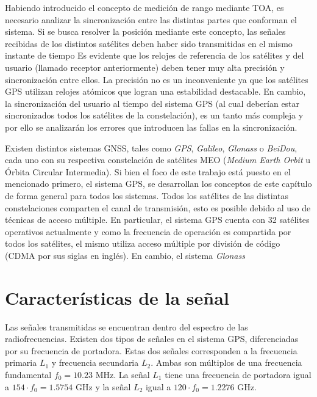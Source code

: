 \documentclass[a4paper,12pt,oneside,onecolumn,final,openright]{book}%
\begin{document}
	Habiendo introducido el concepto de medición de rango mediante TOA, es necesario analizar la sincronización entre las distintas partes que conforman el sistema. Si se busca resolver la posición mediante este concepto, las señales recibidas de los distintos satélites deben haber sido transmitidas en el mismo instante de tiempo Es evidente que los relojes de referencia de los satélites y del usuario (llamado receptor anteriormente) deben tener muy alta precisión y sincronización entre ellos. La precisión no es un inconveniente ya que los satélites GPS utilizan relojes atómicos que logran una estabilidad destacable. En cambio, la sincronización del usuario al tiempo del sistema GPS (al cual deberían estar sincronizados todos los satélites de la constelación), es un tanto más compleja y por ello se analizarán los errores que introducen las fallas en la sincronización.
	
	Existen distintos sistemas GNSS, tales como \textit{GPS}, \textit{Galileo}, \textit{Glonass} o \textit{BeiDou}, cada uno con su respectiva constelación de satélites MEO (\textit{Medium Earth Orbit} u Órbita Circular Intermedia). Si bien el foco de este trabajo está puesto en el mencionado primero, el sistema GPS, se desarrollan los conceptos de este capítulo de forma general para todos los sistemas. Todos los satélites de las distintas constelaciones comparten el canal de transmisión, esto es posible debido al uso de técnicas de acceso múltiple. En particular, el sistema GPS cuenta con 32 satélites operativos actualmente y como la frecuencia de operación es compartida por todos los satélites, el mismo utiliza acceso múltiple por división de código (CDMA por sus siglas en inglés). En cambio, el sistema \textit{Glonass} 
	
\section{Características de la señal}\label{sec:senial}
	Las señales transmitidas se encuentran dentro del espectro de las radiofrecuencias. Existen dos tipos de señales en el sistema GPS, diferenciadas por su frecuencia de portadora. Estas dos señales corresponden a la frecuencia primaria $L_1$ y frecuencia secundaria $L_2$. Ambas son múltiplos de una frecuencia fundamental $f_0=10.23$ MHz. La señal $L_1$ tiene una frecuencia de portadora igual a $154\cdot f_0 = 1.5754$ GHz y la señal $L_2$ igual a $120\cdot f_0 = 1.2276$ GHz.
	
\end{document}
